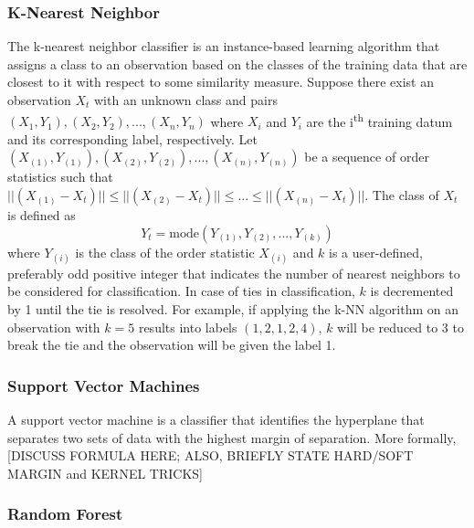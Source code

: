 \documentclass[conference,compsoc]{IEEEtran}
\begin{document}
\subsubsection{K-Nearest Neighbor}
The k-nearest neighbor classifier \cite{altman92} is an instance-based learning algorithm that assigns a class to an observation based on the classes of the training data that are closest to it with respect to some similarity measure. Suppose there exist an observation $X_t$ with an unknown class and pairs $(X_1,Y_1),(X_2,Y_2),...,(X_n,Y_n)$ where $X_i$ and $Y_i$ are the i\textsuperscript{th} training datum and its corresponding label, respectively. Let $(X_{(1)},Y_{(1)}),(X_{(2)},Y_{(2)}),...,(X_{(n)},Y_{(n)})$ be a sequence of order statistics such that  $\lvert\lvert (X_{(1)}-X_t) \rvert\rvert \leq \lvert\lvert (X_{(2)}-X_t) \rvert\rvert \leq ... \leq \lvert\lvert (X_{(n)}-X_t) \rvert\rvert$. The class of $X_t$ is defined as
\[ Y_t = \text{mode}(Y_{(1)},Y_{(2)},...,Y_{(k)})\]
where $Y_{(i)}$ is the class of the order statistic $X_{(i)}$ and $k$ is a user-defined, preferably odd positive integer that indicates the number of nearest neighbors to be considered for classification. In case of ties in classification, $k$ is decremented by 1 until the tie is resolved. For example, if applying the k-NN algorithm on an observation with $k = 5$ results into labels $(1,2,1,2,4)$, $k$ will be reduced to 3 to break the tie and the observation will be given the label 1. 
\subsubsection{Support Vector Machines}
A support vector machine \cite{cortes95} is a classifier that identifies the hyperplane that separates two sets of data with the highest margin of separation. More formally, [DISCUSS FORMULA HERE; ALSO, BRIEFLY STATE HARD/SOFT MARGIN and KERNEL TRICKS]
\subsubsection{Random Forest}
\end{document}

